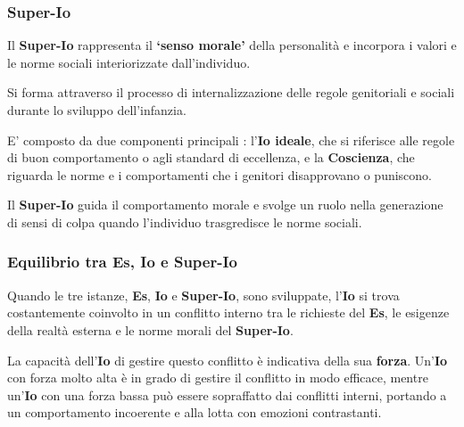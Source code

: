 \documentclass{subfiles}
\begin{document}
\subsubsection{Super-Io}
Il \textbf{Super-Io} rappresenta il \textbf{`senso morale'} della personalità e incorpora i 
valori e le norme sociali interiorizzate dall'individuo.

Si forma attraverso il processo di internalizzazione delle regole genitoriali e sociali durante 
lo sviluppo dell'infanzia.

E' composto da due componenti principali : l'\textbf{Io ideale}, che si riferisce alle regole 
di buon comportamento o agli standard di eccellenza, e la \textbf{Coscienza}, che riguarda le 
norme e i comportamenti che i genitori disapprovano o puniscono.

Il \textbf{Super-Io} guida il comportamento morale e svolge un ruolo nella generazione di sensi 
di colpa quando l'individuo trasgredisce le norme sociali.\\

\subsubsection{Equilibrio tra Es, Io e Super-Io}
Quando le tre istanze, \textbf{Es}, \textbf{Io} e \textbf{Super-Io}, sono sviluppate, 
l'\textbf{Io} si trova costantemente coinvolto in un conflitto interno tra le richieste del 
\textbf{Es}, le esigenze della realtà esterna e le norme morali del \textbf{Super-Io}.

La capacità dell'\textbf{Io} di gestire questo conflitto è indicativa della sua \textbf{forza}. 
Un'\textbf{Io} con forza molto alta è in grado di gestire il conflitto in modo efficace, 
mentre un'\textbf{Io} con una forza bassa può essere sopraffatto dai conflitti interni, portando 
a un comportamento incoerente e alla lotta con emozioni contrastanti.\\
\end{document}
